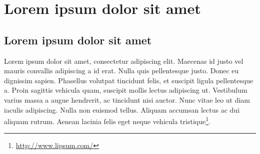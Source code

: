 \documentclass{projetofinal-dcc}
\begin{document}

\maketocpage


\startcontent

\chapter{Lorem ipsum dolor sit amet}\label{chp:LABEL_CHP_1}

\section{Lorem ipsum dolor sit amet}\label{sec:LABEL_CHP_1_SEC_A}
Lorem ipsum dolor sit amet, consectetur adipiscing elit. Maecenas id justo vel mauris convallis adipiscing a id erat. Nulla quis pellentesque justo. Donec eu dignissim sapien. Phasellus volutpat tincidunt felis, et suscipit ligula pellentesque a. Proin sagittis vehicula quam, suscipit mollis lectus adipiscing ut. Vestibulum varius massa a augue hendrerit, ac tincidunt nisi auctor. Nunc vitae leo ut diam iaculis adipiscing. Nulla non euismod tellus. Aliquam accumsan lectus ac dui aliquam rutrum. Aenean lacinia felis eget neque vehicula tristique\footnote{\url{http://www.lipsum.com/}}.
\end{document}
